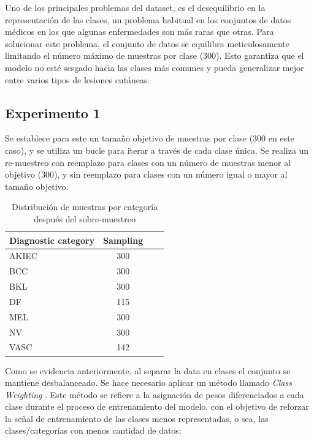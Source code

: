 Uno de los principales problemas del dataset, es el desequilibrio en la representación de las clases, un problema habitual en los conjuntos de datos médicos en los que algunas enfermedades son más raras que otras. Para solucionar este problema, el conjunto de datos se equilibra meticulosamente limitando el número máximo de muestras por clase ($300$). Esto garantiza que el modelo no esté sesgado hacia las clases más comunes y pueda generalizar mejor entre varios tipos de lesiones cutáneas.

\subsection{Experimento 1}

Se establece para este un tamaño objetivo de muestras por clase ($300$ en este caso), y se utiliza un bucle para iterar a través de cada clase única. Se realiza un re-muestreo con reemplazo para clases con un número de muestras menor al objetivo ($300$), y sin reemplazo para clases con un número igual o mayor al tamaño objetivo.

\begin{table}[ht]
   \centering
   \begin{tabular}{lccc}
   \hline
   Diagnostic category & Sampling  \\ \hline
   AKIEC & 300 \\
   BCC & 300 \\
   BKL & 300 \\
   DF & 115 \\
   MEL & 300 \\
   NV & 300 \\
   VASC & 142 \\ \hline
   \end{tabular}
   \caption{Distribución de muestras por categoría después del sobre-muestreo}
   \label{tab:sampling_distribution}
   \end{table}


Como se evidencia anteriormente, al separar la data en clases el conjunto se mantiene desbalanceado. Se hace necesario aplicar un método llamado \textit{Class Weighting} . Este método se refiere a la asignación de pesos diferenciados a cada clase durante el proceso de entrenamiento del modelo, con el objetivo de reforzar la señal de entrenamiento de las clases menos representadas, o sea, las clases/categorías con menos cantidad de datos:

